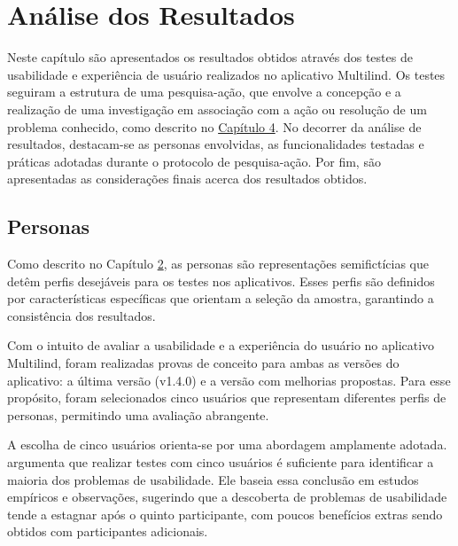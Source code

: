 \chapter[Análise dos Resultados]{Análise dos Resultados}
\label{chap:Status}
Neste capítulo são apresentados os resultados obtidos através dos testes de usabilidade e experiência de usuário realizados no aplicativo Multilind. Os testes seguiram a estrutura de uma pesquisa-ação, que envolve a concepção e a realização de uma 
investigação em associação com a ação ou resolução de um problema conhecido, como descrito no \hyperref[sec:Metodologia de Analise de Resultados]{Capítulo 4}. No decorrer da análise de resultados, destacam-se as personas envolvidas, as funcionalidades 
testadas e práticas adotadas durante o protocolo de pesquisa-ação. Por fim, são apresentadas as considerações finais acerca dos resultados obtidos.

\section{Personas}
\label{sec:Personas}
Como descrito no Capítulo \hyperref[sec:Persona]{2}, as personas são representações semifictícias que detêm perfis desejáveis para os testes nos aplicativos. Esses perfis são definidos por características específicas que orientam a seleção da amostra, 
garantindo a consistência dos resultados. 

Com o intuito de avaliar a usabilidade e a experiência do usuário no aplicativo Multilind, foram realizadas provas de conceito para ambas as versões do aplicativo: a última versão (v1.4.0) e a versão com melhorias propostas. Para esse propósito, 
foram selecionados cinco usuários que representam diferentes perfis de personas, permitindo uma avaliação abrangente.

A escolha de cinco usuários orienta-se por uma abordagem amplamente adotada.  argumenta que realizar testes com cinco usuários é suficiente para identificar a maioria dos problemas de 
usabilidade. Ele baseia essa conclusão em estudos empíricos e observações, sugerindo que a descoberta de problemas de usabilidade tende a estagnar após o quinto participante, com poucos benefícios 
extras sendo obtidos com participantes adicionais.

